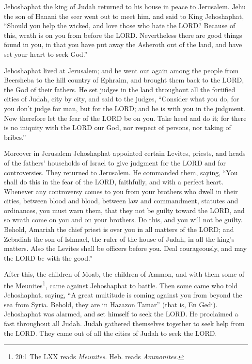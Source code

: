 \mychapter{} \myverse*{}Jehoshaphat the king of Judah returned to his house in peace to
Jerusalem.
\myverse{}Jehu the son of Hanani the seer went out to meet him, and said to King Jehoshaphat,
“Should you help the wicked, and love those who hate the LORD? Because of this, wrath is on you from before
the LORD.
\myverse{}Nevertheless there are good things found in you, in that you have put away
the Asheroth out of the land, and have set your heart to seek God.”

\myverse{}Jehoshaphat lived at Jerusalem; and he went out again among the
people from Beersheba to the hill country of Ephraim, and brought them back to the LORD, the God of their
fathers.
\myverse{}He set judges in the land throughout all the fortified cities of Judah, city
by city,
\myverse{}and said to the judges, “Consider what you do, for you don’t judge for man,
but for the LORD; and he is with you in the judgment.
\myverse{}Now therefore let the fear of the LORD be on you. Take heed and do it; for
there is no iniquity with the LORD our God, nor respect of persons, nor taking of bribes.”

\myverse{}Moreover in Jerusalem Jehoshaphat appointed certain Levites, priests,
and heads of the fathers’ households of Israel to give judgment for the LORD and for controversies. They
returned to Jerusalem.
\myverse{}He commanded them, saying, “You shall do this in the fear of the LORD, faithfully,
and with a perfect heart.
\myverse{}Whenever any controversy comes to you from your brothers who dwell in their
cities, between blood and blood, between law and commandment, statutes and ordinances, you must warn them,
that they not be guilty toward the LORD, and so wrath come on you and on your brothers. Do this, and you
will not be guilty.
\myverse{}Behold, Amariah the chief priest is over you in all matters of the LORD;
and Zebadiah the son of Ishmael, the ruler of the house of Judah, in all the king’s matters. Also the
Levites shall be officers before you. Deal courageously, and may the LORD be with the good.”


\mychapter{} \myverse*{}After this, the children of Moab, the children of Ammon, and with
them some of the Meunites\footnote{20:1 The LXX reads
	\textit{Meunites}. Heb. reads
	\textit{Ammonites}.}, came against Jehoshaphat to battle.
\myverse{}Then some came who told Jehoshaphat, saying, “A great multitude is coming against
you from beyond the sea from Syria. Behold, they are in Hazazon Tamar” (that is, En Gedi).
\myverse{}Jehoshaphat was alarmed, and set himself to seek the LORD. He proclaimed a
fast throughout all Judah.
\myverse{}Judah gathered themselves together to seek help from the LORD. They came out
of all the cities of Judah to seek the LORD.

